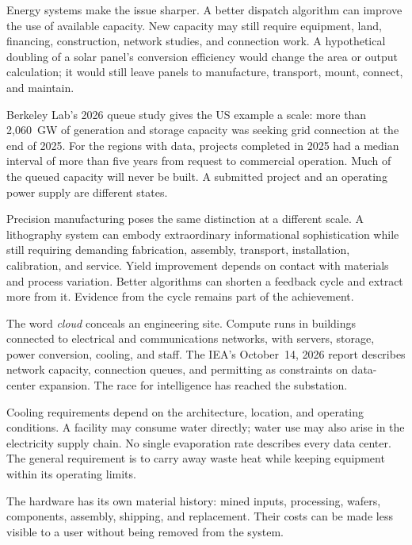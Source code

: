 Energy systems make the issue sharper. A better dispatch algorithm can improve the use of available capacity. New capacity may still require equipment, land, financing, construction, network studies, and connection work. A hypothetical doubling of a solar panel's conversion efficiency would change the area or output calculation; it would still leave panels to manufacture, transport, mount, connect, and maintain.

Berkeley Lab's 2026 queue study gives the US example a scale: more than 2,060~GW of generation and storage capacity was seeking grid connection at the end of 2025. For the regions with data, projects completed in 2025 had a median interval of more than five years from request to commercial operation. Much of the queued capacity will never be built. A submitted project and an operating power supply are different states.\cite{berkeley2026queues}

Precision manufacturing poses the same distinction at a different scale. A lithography system can embody extraordinary informational sophistication while still requiring demanding fabrication, assembly, transport, installation, calibration, and service. Yield improvement depends on contact with materials and process variation. Better algorithms can shorten a feedback cycle and extract more from it. Evidence from the cycle remains part of the achievement.


The word \emph{cloud} conceals an engineering site. Compute runs in buildings connected to electrical and communications networks, with servers, storage, power conversion, cooling, and staff. The IEA's October~14, 2026 report describes network capacity, connection queues, and permitting as constraints on data-center expansion.\cite{iea2026powering} The race for intelligence has reached the substation.

Cooling requirements depend on the architecture, location, and operating conditions. A facility may consume water directly; water use may also arise in the electricity supply chain. No single evaporation rate describes every data center. The general requirement is to carry away waste heat while keeping equipment within its operating limits.

The hardware has its own material history: mined inputs, processing, wafers, components, assembly, shipping, and replacement. Their costs can be made less visible to a user without being removed from the system.

